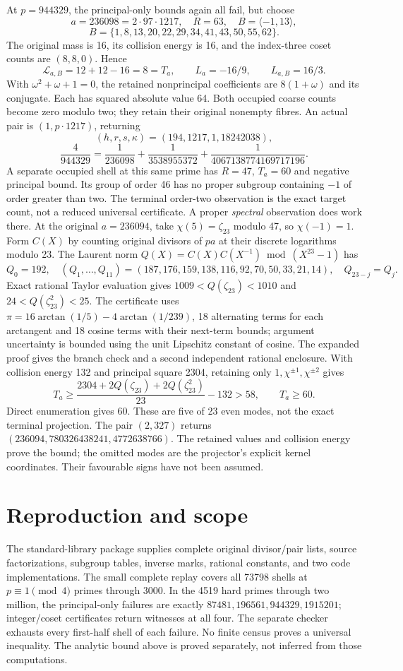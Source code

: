 \documentclass[10pt,reqno]{amsart}
\begin{document}
At $p=944329$, the principal-only bounds again all fail, but choose
\[
 a=236098=2\cdot97\cdot1217,
 \quad R=63,\quad B=\langle-1,13\rangle,
\]
\[
 B=\{1,8,13,20,22,29,34,41,43,50,55,62\}.
\]
The original mass is 16, its collision energy is 16, and the index-three coset
counts are $(8,8,0)$. Hence
\[
 \mathcal L_{a,B}=12+12-16=8=T_a,
 \qquad L_a=-16/9,
 \qquad L_{a,B}=16/3.
\]
With $\omega^2+\omega+1=0$, the retained nonprincipal coefficients are
$8(1+\omega)$ and its conjugate. Each has squared absolute value 64.
Both occupied coarse counts become zero modulo two; they retain their original
nonempty fibres. An actual pair is $(1,p\cdot1217)$, returning
\[
 (h,r,s,\kappa)=(194,1217,1,18242038),
\]
\[
 \frac4{944329}=\frac1{236098}+\frac1{3538955372}
                       +\frac1{4067138774169717196}.
\]
A separate occupied shell at this same prime has $R=47$, $T_a=60$ and negative
principal bound. Its group of order 46 has no proper subgroup containing $-1$
of order greater than two. The terminal order-two observation is the exact
target count, not a reduced universal certificate. A proper \emph{spectral}
observation does work there. At the original $a=236094$, take
$\chi(5)=\zeta_{23}$ modulo 47, so $\chi(-1)=1$. Form $C(X)$ by counting original
divisors of $pa$ at their discrete logarithms modulo 23. The Laurent norm
$Q(X)=C(X)C(X^{-1})\bmod(X^{23}-1)$ has
\[
 Q_0=192,\quad(Q_1,\ldots,Q_{11})=(187,176,159,138,116,92,70,50,33,21,14),
 \quad Q_{23-j}=Q_j.
\]
Exact rational Taylor evaluation gives
$1009<Q(\zeta_{23})<1010$ and $24<Q(\zeta_{23}^2)<25$.
The certificate uses $\pi=16\arctan(1/5)-4\arctan(1/239)$,
18 alternating terms for each arctangent and 18 cosine terms with their
next-term bounds; argument uncertainty is bounded using the unit Lipschitz
constant of cosine. The expanded proof gives the branch check and a second
independent rational enclosure. With collision energy 132 and principal square 2304,
retaining only $1,\chi^{\pm1},\chi^{\pm2}$ gives
\[
 T_a\ge\frac{2304+2Q(\zeta_{23})+2Q(\zeta_{23}^2)}{23}-132
 >58,\qquad T_a\ge60.
\]
Direct enumeration gives 60. These are five of 23 even modes, not the exact
terminal projection. The pair $(2,327)$ returns
$(236094,780326438241,4772638766)$.
The retained values and collision energy prove the bound; the omitted modes
are the projector's explicit kernel coordinates. Their favourable signs have
not been assumed.

\section{Reproduction and scope}
The standard-library package supplies complete original divisor/pair lists,
source factorizations, subgroup tables, inverse marks, rational constants, and
two code implementations. The small complete replay covers all 73798 shells
at $p\equiv1\pmod4$ primes through 3000. In the 4519 hard primes through two
million, the principal-only failures are exactly
$87481,196561,944329,1915201$; integer/coset certificates return witnesses at all
four. The separate checker exhausts every first-half shell of each failure.
No finite census proves a universal inequality. The analytic bound above is
proved separately, not inferred from those computations.
\end{document}
